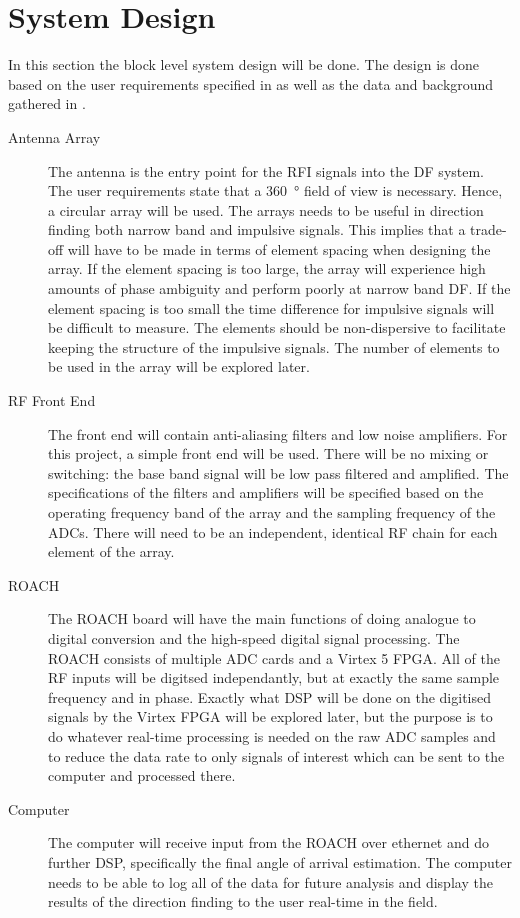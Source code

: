 \chapter{System Design}
\label{ch:system-design}
\graphicspath{{./img/system-design/}}

In this section the block level system design will be done. 
The design is done based on the user requirements specified in  as well as the data and background gathered in .

\begin{description}
  \item [Antenna Array] The antenna is the entry point for the RFI signals into the DF system. The user requirements state that a \SI{360}{\degree} field of view is necessary. Hence, a circular array will be used. The arrays needs to be useful in direction finding both narrow band and impulsive signals. This implies that a trade-off will have to be made in terms of element spacing when designing the array. If the element spacing is too large, the array will experience high amounts of phase ambiguity and perform poorly at narrow band DF. If the element spacing is too small the time difference for impulsive signals will be difficult to measure. The elements should be non-dispersive to facilitate keeping the structure of the impulsive signals. The number of elements to be used in the array will be explored later.
  \item [RF Front End] The front end will contain anti-aliasing filters and low noise amplifiers. For this project, a simple front end will be used. There will be no mixing or switching: the base band signal will be low pass filtered and amplified. The specifications of the filters and amplifiers will be specified based on the operating frequency band of the array and the sampling frequency of the ADCs. There will need to be an independent, identical RF chain for each element of the array.
  \item [ROACH] The ROACH board will have the main functions of doing analogue to digital conversion and the high-speed digital signal processing. The ROACH consists of multiple ADC cards and a Virtex 5 FPGA. All of the RF inputs will be digitsed independantly, but at exactly the same sample frequency and in phase. Exactly what DSP will be done on the digitised signals by the Virtex FPGA will be explored later, but the purpose is to do whatever real-time processing is needed on the raw ADC samples and to reduce the data rate to only signals of interest which can be sent to the computer and processed there.
  \item [Computer] The computer will receive input from the ROACH over ethernet and do further DSP, specifically the final angle of arrival estimation. The computer needs to be able to log all of the data for future analysis and display the results of the direction finding to the user real-time in the field.
\end{description}


